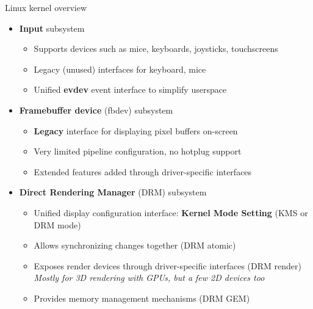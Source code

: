 \begin{frame}{Linux kernel overview}
  \begin{itemize}
  \item \textbf{Input} subsystem
    \begin{itemize}
    \item Supports devices such as mice, keyboards, joysticks, touchscreens
    \item Legacy (unused) interfaces for keyboard, mice
    \item Unified \textbf{evdev} event interface to simplify userspace
    \end{itemize}
  \item \textbf{Framebuffer device} (fbdev) subsystem
    \begin{itemize}
    \item \textbf{Legacy} interface for displaying pixel buffers on-screen
    \item Very limited pipeline configuration, no hotplug support
    \item Extended features added through driver-specific interfaces
    \end{itemize}
  \item \textbf{Direct Rendering Manager} (DRM) subsystem
    \begin{itemize}
    \item Unified display configuration interface: \textbf{Kernel Mode Setting} (KMS or DRM mode)
    \item Allows synchronizing changes together (DRM atomic)
    \item Exposes render devices through driver-specific interfaces (DRM render)\\
      \textit{Mostly for 3D rendering with GPUs, but a few 2D devices too}
    \item Provides memory management mechanisms (DRM GEM)
    \end{itemize}
  \end{itemize}
\end{frame}

